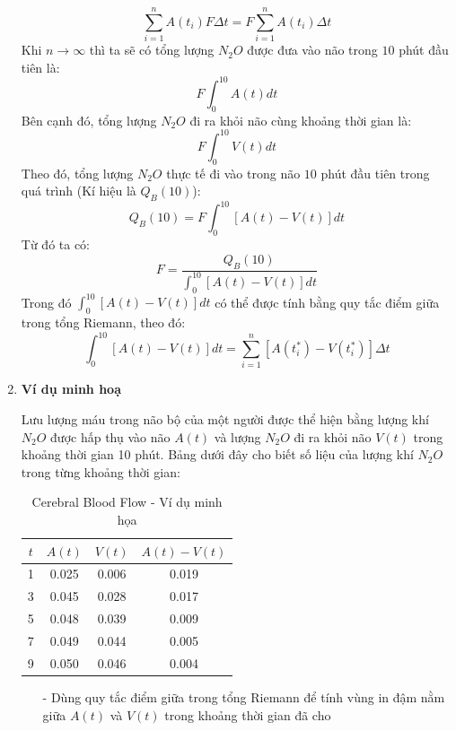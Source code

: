 \documentclass[12pt,a4paper]{article}
\begin{document}
\begin{enumerate}[a/]
\begin{flushleft}
		      $$\sum_{i = 1}^{n} A(t_i)F\Delta t = F \sum_{i = 1}^{n} A(t_i) \Delta t$$
		      Khi $n \to \infty$ thì ta sẽ có tổng lượng $N_2O$ được đưa vào não trong $10$ phút đầu tiên là:
		      $$F \int_{0}^{10} A(t)dt$$
		      Bên cạnh đó, tổng lượng $N_2O$ đi ra khỏi não cùng khoảng thời gian là:
		      $$F \int_{0}^{10} V(t)dt$$
		      Theo đó, tổng lượng $N_2O$ thực tế đi vào trong não $10$ phút đầu tiên trong quá trình (Kí hiệu là $Q_B(10)$):
		      $$Q_B(10)=F\int_{0}^{10}\left[A(t)-V(t)\right]dt$$
		      Từ đó ta có:
		      $$F=\frac{Q_B(10)}{\displaystyle \int_{0}^{10}\left[A(t) - V(t)\right]dt}$$
		      Trong đó $\displaystyle \int_{0}^{10}\left[A(t) - V(t)\right]dt$ có thể được tính bằng quy tắc điểm giữa trong tổng Riemann, theo đó:
		      $$\displaystyle \int_{0}^{10}\left[A(t) - V(t)\right]dt = \sum_{i = 1}^{n} \left[A(t_i^*)-V(t_i^*)\right] \Delta t$$
	      \end{flushleft}
	\item \textbf{Ví dụ minh hoạ}
	      \begin{flushleft}
		      Lưu lượng máu trong não bộ của một người được thể hiện bằng lượng khí $N_2O$ được hấp thụ vào não $A(t)$ và lượng $N_2O$ đi ra khỏi não $V(t)$ trong khoảng thời gian 10 phút.
		      Bảng dưới đây cho biết số liệu của lượng khí $N_2O$ trong từng khoảng thời gian:
	      \end{flushleft}
	      \begin{table}[H]
		      \centering
		      \def\arraystretch{1.2}
		      \begin{tabular}{|c|c|c|c|}
			      \hline
			      $t$ & $A(t)$ & $V(t)$ & $A(t) - V(t)$ \\
			      \hline
			      1   & 0.025  & 0.006  & 0.019         \\
			      \hline
			      3   & 0.045  & 0.028  & 0.017         \\
			      \hline
			      5   & 0.048  & 0.039  & 0.009         \\
			      \hline
			      7   & 0.049  & 0.044  & 0.005         \\
			      \hline
			      9   & 0.050  & 0.046  & 0.004         \\
			      \hline
		      \end{tabular}
			  \caption{Cerebral Blood Flow - Ví dụ minh họa}
	      \end{table}
	      \begin{itemize}
		      \item[-] Dùng quy tắc điểm giữa trong tổng Riemann để tính vùng in đậm nằm giữa $A(t)$ và $V(t)$ trong khoảng thời gian đã cho

\end{itemize}
\end{enumerate}
\end{document}
